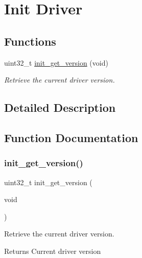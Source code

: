 \hypertarget{group__doc__driver__hal__helper__init}{}\section{Init Driver}
\label{group__doc__driver__hal__helper__init}
\subsection*{Functions}
\begin{DoxyCompactItemize}
\item 
uint32\+\_\+t \hyperlink{group__doc__driver__hal__helper__init_ga7f3a0a79c14d4043ea30435f561af05f}{init\+\_\+get\+\_\+version} (void)
\begin{DoxyCompactList}\small\item\em Retrieve the current driver version. \end{DoxyCompactList}\end{DoxyCompactItemize}


\subsection{Detailed Description}


\subsection{Function Documentation}
\mbox{\label{group__doc__driver__hal__helper__init_ga7f3a0a79c14d4043ea30435f561af05f}} 
\subsubsection{\texorpdfstring{init\+\_\+get\+\_\+version()}{init\_get\_version()}}
{\footnotesize\ttfamily uint32\+\_\+t init\+\_\+get\+\_\+version (\begin{DoxyParamCaption}\item[{void}]{ }\end{DoxyParamCaption})}



Retrieve the current driver version. 

\begin{DoxyReturn}{Returns}
Current driver version 
\end{DoxyReturn}
